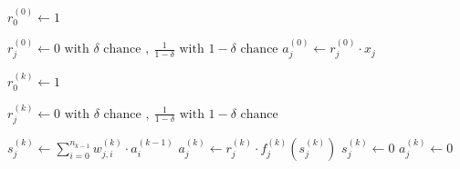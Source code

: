 \documentclass[titlepage]{article}
\begin{document}
          \begin{algorithm}
            \caption{%
              Modified version of algorithm \ref{algeval} with dropout
              regularization.
            } \label{algevaldrop}
            \begin{algorithmic}
                \State $r_0^{(0)} \gets 1$

                  \State $
                    r_j^{(0)} \gets
                      0 \text{ with } \delta \text{ chance },
                      \ \frac{1}{1-\delta} \text{ with } 1-\delta \text{ chance}
                  $
                  \State $a_j^{(0)} \gets r_j^{(0)} \cdot x_j$
                \EndFor

                  \State $r_0^{(k)} \gets 1$

                    \State $
                      r_j^{(k)} \gets
                        0 \text{ with } \delta \text{ chance },
                        \ \frac{1}{1-\delta} \text{ with } 1-\delta \text{ chance}
                    $

                      \State $
                        s_j^{(k)} \gets
                          \sum_{i=0}^{n_{k-1}} w_{j,i}^{(k)} \cdot a_i^{(k-1)}
                      $
                      \State $
                        a_j^{(k)} \gets r_j^{(k)} \cdot f_j^{(k)} \left( s_j^{(k)} \right)
                      $
                    \Else
                      \State $s_j^{(k)} \gets 0$
                      \State $a_j^{(k)} \gets 0$
                    \EndIf
                  \EndFor
                \EndFor
              \EndProcedure
            \end{algorithmic}
          \end{algorithm}
\end{document}
